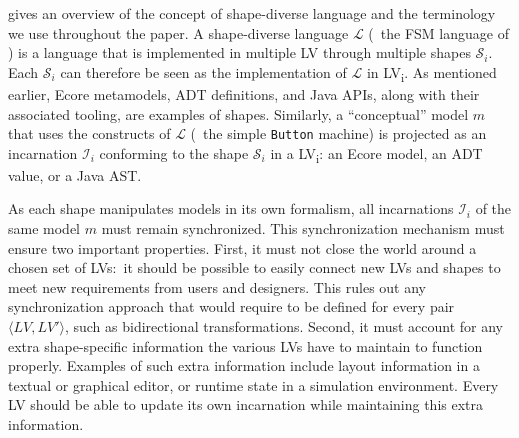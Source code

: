  gives an overview of the concept of shape-diverse language and the terminology we use throughout the paper.
A shape-diverse language $\mathcal{L}$ (\eg~the FSM language of ) is a language that is implemented in multiple LV through multiple shapes $\mathcal{S}_i$.
Each $\mathcal{S}_i$ can therefore be seen as the implementation of $\mathcal{L}$ in LV\textsubscript{i}.
As mentioned earlier, Ecore metamodels, ADT definitions, and Java APIs, along with their associated tooling, are examples of shapes.
Similarly, a ``conceptual'' model $m$ that uses the constructs of $\mathcal{L}$ (\eg~the simple {\footnotesize \texttt{Button}} machine) is projected as an incarnation $\mathcal{I}_i$ conforming to the shape $\mathcal{S}_i$ in a LV\textsubscript{i}: an Ecore model, an ADT value, or a Java AST.


As each shape manipulates models in its own formalism, all incarnations $\mathcal{I}_i$ of the same model $m$ must remain synchronized.
This synchronization mechanism must ensure two important properties.
First, it must not close the world around a chosen set of LVs:~it should be possible to easily connect new LVs and shapes to meet new requirements from users and designers.
This rules out any synchronization approach that would require to be defined for every pair $\langle LV, LV' \rangle$, such as bidirectional transformations. 
Second, it must account for any extra shape-specific information the various LVs have to maintain to function properly.
Examples of such extra information include layout information in a textual or graphical editor, or runtime state in a simulation environment.
Every LV should be able to update its own incarnation while maintaining this extra information.
